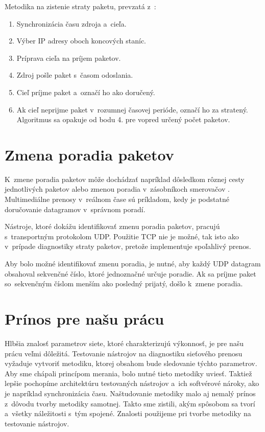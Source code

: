 \noindent Metodika na zistenie straty paketu, prevzatá z~\cite{rfc_one_way_loss}: 
\begin{enumerate}
    \item Synchronizácia času zdroja a~cieľa.
    \item Výber IP adresy oboch koncových staníc.
    \item Príprava cieľa na príjem paketov.
    \item Zdroj pošle paket s~časom odoslania.
    \item Cieľ príjme paket a~označí ho ako doručený.
    \item Ak cieľ neprijme paket v~rozumnej časovej perióde, 
        označí ho za stratený. Algoritmus sa opakuje od bodu 4.
        pre vopred určený počet paketov.
\end{enumerate}

\section{Zmena poradia paketov} \label{reorder}
K~zmene poradia paketov môže dochádzať napríklad dôsledkom rôznej cesty
jednotlivých paketov alebo zmenou poradia v~zásobníkoch smerovačov 
\cite{rfc_reorder}. 
Multimediálne prenosy v~reálnom čase sú príkladom, kedy je podstatné doručovanie 
datagramov v~správnom poradí.

Nástroje, ktoré dokážu identifikovať zmenu poradia paketov, pracujú
s~transportným protokolom UDP. Použitie TCP nie je možné, tak isto ako v~prípade
diagnostiky straty paketov, pretože implementuje spoľahlivý prenos.

Aby bolo možné identifikovať zmenu poradia, je nutné, aby každý UDP datagram
obsahoval sekvenčné číslo, ktoré jednoznačné určuje poradie. Ak sa príjme paket
so~sekvenčným číslom menším ako posledný prijatý, došlo k~zmene poradia.

\newpage 

\section{Prínos pre našu prácu} \label{parametre_prinos}
Hlbšia znalosť parametrov siete, ktoré charakterizujú výkonnosť, je pre našu
prácu veľmi dôležitá. Testovanie nástrojov na diagnostiku sieťového prenosu 
vyžaduje vytvoriť metodiku, ktorej obsahom bude sledovanie týchto parametrov.
Aby sme chápali princípom merania, bolo nutné tieto metodiky uviesť. Taktiež 
lepšie pochopíme architektúru testovaných nástrojov a~ich softvérové 
nároky, ako je napríklad synchronizácia času. Naštudovanie metodiky malo aj
nemalý prínos z~dôvodu tvorby metodiky samotnej. Takto sme zistili, akým spôsobom
sa tvorí a~všetky náležitosti s~tým spojené. Znalosti použijeme pri tvorbe metodiky
na testovanie nástrojov.

